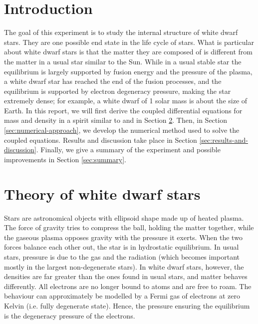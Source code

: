 \documentclass[]{article}
\begin{document}
\section{Introduction}
	The goal of this experiment is to study the internal structure of white dwarf stars. They are one possible end state in the life cycle of stars. What is particular about white dwarf stars is that the matter they are composed of is different from the matter in a usual star similar to the Sun. While in a usual stable star the equilibrium is largely supported by fusion energy and the pressure of the plasma, a white dwarf star has reached the end of the fusion processes, and the equilibrium is supported by electron degeneracy pressure, making the star extremely dense; for example, a white dwarf of 1 solar mass is about the size of Earth. In this report, we will first derive the coupled differential equations for mass and density in a spirit similar to \cite{OxfPhys2020} and \cite{Chandrasekhar1984} in Section \ref{sec:theroy-white-dwarfs}. Then, in Section \ref{sec:numerical-approach}, we develop the numerical method used to solve the coupled equations. Results and discussion take place in Section \ref{sec:results-and-discussion}. Finally, we give a summary of the experiment and possible improvements in Section \ref{sec:summary}.

\section{Theory of white dwarf stars}\label{sec:theroy-white-dwarfs}
	Stars are astronomical objects with ellipsoid shape made up of heated plasma. The force of gravity tries to compress the ball, holding the matter together, while the gaseous plasma opposes gravity with the pressure it exerts. When the two forces balance each other out, the star is in hydrostatic equilibrium. In usual stars, pressure is due to the gas and the radiation (which becomes important mostly in the largest non-degenerate stars). In white dwarf stars, however, the densities are far greater than the ones found in usual stars, and matter behaves differently. All electrons are no longer bound to atoms and are free to roam. The behaviour can approximately be modelled by a Fermi gas of electrons at zero Kelvin (i.e. fully degenerate state). Hence, the pressure ensuring the equilibrium is the degeneracy pressure of the electrons.
\end{document}
